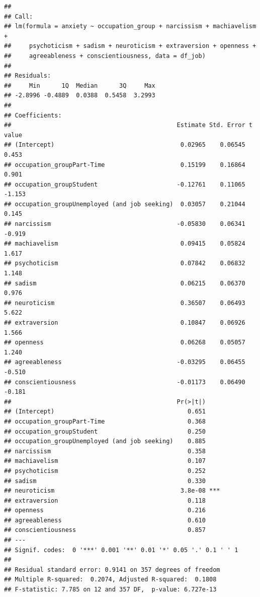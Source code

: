 \documentclass[
]{article}
\begin{document}
\begin{verbatim}
## 
## Call:
## lm(formula = anxiety ~ occupation_group + narcissism + machiavelism + 
##     psychoticism + sadism + neuroticism + extraversion + openness + 
##     agreeableness + conscientiousness, data = df_job)
## 
## Residuals:
##     Min      1Q  Median      3Q     Max 
## -2.8996 -0.4889  0.0388  0.5458  3.2993 
## 
## Coefficients:
##                                              Estimate Std. Error t value
## (Intercept)                                   0.02965    0.06545   0.453
## occupation_groupPart-Time                     0.15199    0.16864   0.901
## occupation_groupStudent                      -0.12761    0.11065  -1.153
## occupation_groupUnemployed (and job seeking)  0.03057    0.21044   0.145
## narcissism                                   -0.05830    0.06341  -0.919
## machiavelism                                  0.09415    0.05824   1.617
## psychoticism                                  0.07842    0.06832   1.148
## sadism                                        0.06215    0.06370   0.976
## neuroticism                                   0.36507    0.06493   5.622
## extraversion                                  0.10847    0.06926   1.566
## openness                                      0.06268    0.05057   1.240
## agreeableness                                -0.03295    0.06455  -0.510
## conscientiousness                            -0.01173    0.06490  -0.181
##                                              Pr(>|t|)    
## (Intercept)                                     0.651    
## occupation_groupPart-Time                       0.368    
## occupation_groupStudent                         0.250    
## occupation_groupUnemployed (and job seeking)    0.885    
## narcissism                                      0.358    
## machiavelism                                    0.107    
## psychoticism                                    0.252    
## sadism                                          0.330    
## neuroticism                                   3.8e-08 ***
## extraversion                                    0.118    
## openness                                        0.216    
## agreeableness                                   0.610    
## conscientiousness                               0.857    
## ---
## Signif. codes:  0 '***' 0.001 '**' 0.01 '*' 0.05 '.' 0.1 ' ' 1
## 
## Residual standard error: 0.9141 on 357 degrees of freedom
## Multiple R-squared:  0.2074, Adjusted R-squared:  0.1808 
## F-statistic: 7.785 on 12 and 357 DF,  p-value: 6.727e-13
\end{verbatim}
\end{document}
